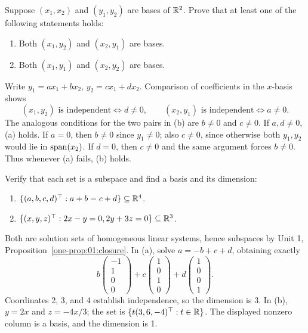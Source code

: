 \begin{problem}\label{ex:03:mixed-bases}
Suppose \((x_1,x_2)\) and \((y_1,y_2)\) are bases of \(\mathbb R^2\).
Prove that at least one of the following statements holds:
\begin{enumerate}
\item Both \((x_1,y_2)\) and \((x_2,y_1)\) are bases.
\item Both \((x_1,y_1)\) and \((x_2,y_2)\) are bases.
\end{enumerate}
\end{problem}
\begin{solution}
Write \(y_1=ax_1+bx_2\), \(y_2=cx_1+dx_2\).
Comparison of coefficients in the \(x\)-basis shows
\[
(x_1,y_2)\text{ is independent}\iff d\ne0,\qquad
(x_2,y_1)\text{ is independent}\iff a\ne0.
\]
The analogous conditions for the two pairs in (b) are \(b\ne0\) and \(c\ne0\).
If \(a,d\ne0\), (a) holds. If \(a=0\), then \(b\ne0\) since \(y_1\ne0\);
also \(c\ne0\), since otherwise both \(y_1,y_2\) would lie in \(\operatorname{span}(x_2)\).
If \(d=0\), then \(c\ne0\) and the same argument forces \(b\ne0\).
Thus whenever (a) fails, (b) holds.
\end{solution}

\begin{problem}\label{ex:03:constraint-dimensions}
Verify that each set is a subspace and find a basis and its dimension:
\begin{enumerate}
\item \(\{(a,b,c,d)^\top:a+b=c+d\}\subseteq\mathbb R^4\).
\item \(\{(x,y,z)^\top:2x-y=0, 2y+3z=0\}\subseteq\mathbb R^3\).
\end{enumerate}
\end{problem}
\begin{solution}
Both are solution sets of homogeneous linear systems, hence subspaces
by Unit 1, Proposition~\ref{one-prop:01:closure}.
In (a), solve \(a=-b+c+d\), obtaining exactly
\[
b\begin{pmatrix}-1\\1\\0\\0\end{pmatrix}
+c\begin{pmatrix}1\\0\\1\\0\end{pmatrix}
+d\begin{pmatrix}1\\0\\0\\1\end{pmatrix}.
\]
Coordinates 2, 3, and 4 establish independence, so the dimension is 3.
In (b), \(y=2x\) and \(z=-4x/3\); the set is
\(\{t(3,6,-4)^\top:t\in\mathbb R\}\). The displayed nonzero column is a basis,
and the dimension is 1.
\end{solution}

